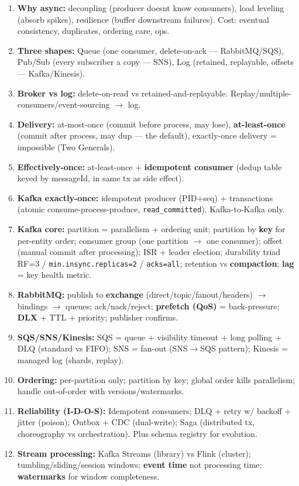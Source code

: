 \documentclass[11pt]{article}
\providecommand{\tightlist}{\setlength{\itemsep}{1pt}\setlength{\parskip}{0pt}}
\begin{document}
\begin{enumerate}
\def\labelenumi{\arabic{enumi}.}
\tightlist
\item
  \textbf{Why async:} decoupling (producer doesn\textquotesingle t know consumers), load leveling (absorb spikes), resilience (buffer downstream failures). Cost: eventual consistency, duplicates, ordering care, ops.
\item
  \textbf{Three shapes:} Queue (one consumer, delete-on-ack --- RabbitMQ/SQS), Pub/Sub (every subscriber a copy --- SNS), Log (retained, replayable, offsets --- Kafka/Kinesis).
\item
  \textbf{Broker vs log:} delete-on-read vs retained-and-replayable. Replay/multiple-consumers/event-sourcing \(\rightarrow\) log.
\item
  \textbf{Delivery:} at-most-once (commit before process, may lose), \textbf{at-least-once} (commit after process, may dup --- the default), exactly-once delivery = impossible (Two Generals).
\item
  \textbf{Effectively-once:} at-least-once + \textbf{idempotent consumer} (dedup table keyed by messageId, in same tx as side effect).
\item
  \textbf{Kafka exactly-once:} idempotent producer (PID+seq) + transactions (atomic consume-process-produce, \texttt{read\_committed}). Kafka-to-Kafka only.
\item
  \textbf{Kafka core:} partition = parallelism + ordering unit; partition by \textbf{key} for per-entity order; consumer group (one partition \(\rightarrow\) one consumer); offset (manual commit after processing); ISR + leader election; durability triad RF=3 / \texttt{min.insync.replicas=2} / \texttt{acks=all}; retention vs \textbf{compaction}; \textbf{lag} = key health metric.
\item
  \textbf{RabbitMQ:} publish to \textbf{exchange} (direct/topic/fanout/headers) \(\rightarrow\) bindings \(\rightarrow\) queues; ack/nack/reject; \textbf{prefetch (QoS)} = back-pressure; \textbf{DLX} + TTL + priority; publisher confirms.
\item
  \textbf{SQS/SNS/Kinesis:} SQS = queue + visibility timeout + long polling + DLQ (standard vs FIFO); SNS = fan-out (SNS\(\rightarrow\)SQS pattern); Kinesis = managed log (shards, replay).
\item
  \textbf{Ordering:} per-partition only; partition by key; global order kills parallelism; handle out-of-order with versions/watermarks.
\item
  \textbf{Reliability (I-D-O-S):} Idempotent consumers; DLQ + retry w/ backoff + jitter (poison); Outbox + CDC (dual-write); Saga (distributed tx, choreography vs orchestration). Plus schema registry for evolution.
\item
  \textbf{Stream processing:} Kafka Streams (library) vs Flink (cluster); tumbling/sliding/session windows; \textbf{event time} not processing time; \textbf{watermarks} for window completeness.
\end{enumerate}
\end{document}

